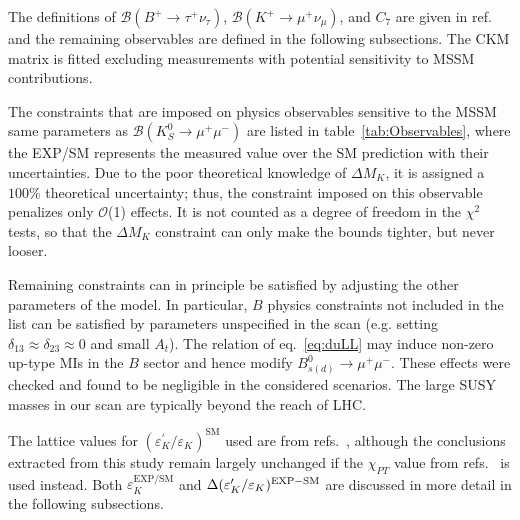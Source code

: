 The definitions of $\mathcal{B}(B^+\rightarrow\tau^+\nu_{\tau})$, $\mathcal{B}(K^+\rightarrow\mu^+\nu_{\mu})$, and $C_{7}$ are given in ref.~\cite{Altmannshofer:2009ne} and the remaining observables are defined in the following subsections. The CKM matrix is fitted excluding measurements with potential sensitivity to MSSM contributions. 

The constraints that are imposed on physics observables sensitive to the MSSM same parameters as $\mathcal{B}(K_S^0\rightarrow\mu^+\mu^-)$ are listed in table~\ref{tab:Observables}, where the EXP/SM represents the measured value over the SM prediction with their uncertainties. Due to the poor theoretical knowledge of $\Delta M_K$, it is assigned a $100\%$ theoretical uncertainty; thus, the constraint imposed on this observable penalizes only $\mathcal{O}$(1) effects. It is not counted as a degree of freedom in the $\chi^2$ tests, so that the $\Delta M_K$ constraint can only make the bounds tighter, but never looser.

Remaining constraints can in principle be satisfied by adjusting the other parameters of the model. In particular, $B$ physics constraints not included in the list can be satisfied by parameters unspecified in the scan (e.g. setting $\delta_{13} \approx \delta_{23} \approx 0$ and small $A_t$). The relation of eq.~\eqref{eq:duLL} may induce non-zero up-type MIs in the $B$ sector and hence modify $B^0_{s(d)}\rightarrow\mu^+\mu^-$. These effects were checked and found to be negligible in the considered scenarios. The large SUSY masses in our scan are typically beyond the reach of LHC.

The lattice values  for $(\varepsilon^{\prime}_K/\varepsilon_K)^{\textrm{SM}}$ used are from refs.~\cite{Blum:2011ng, Blum:2012uk,Blum:2015ywa,Bai:2015nea}, although the conclusions extracted from this study remain largely unchanged if the $\chi_{PT}$ value from refs.~\cite{Pallante:2001he,Hambye:2003cy,Mullor} is used instead. Both $\varepsilon_K^{\textrm{EXP}/\textrm{SM}}$ and $\Delta(\varepsilon^{\prime}_K/\varepsilon_K)^{{\rm EXP}-{\rm SM}}$ are discussed in more detail in the following subsections.

